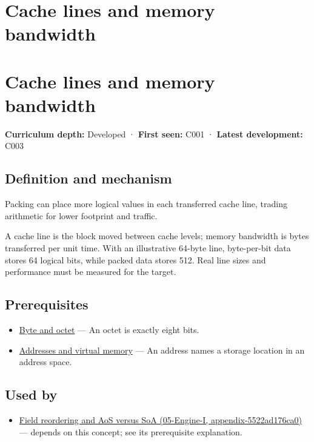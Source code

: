 \hypertarget{appendix-e4ccdbab8320}{}
\section*{Cache lines and memory bandwidth}
\section{Cache lines and memory bandwidth}\label{cache-lines-and-memory-bandwidth}

\textbf{Curriculum depth:} Developed · \textbf{First seen:} C001 · \textbf{Latest development:} C003

\subsection{Definition and mechanism}\label{definition-and-mechanism}

Packing can place more logical values in each transferred cache line, trading arithmetic for lower footprint and traffic.

A cache line is the block moved between cache levels; memory bandwidth is bytes transferred per unit time. With an illustrative 64-byte line, byte-per-bit data stores 64 logical bits, while packed data stores 512. Real line sizes and performance must be measured for the target.

\subsection{Prerequisites}\label{prerequisites}

\begin{itemize}
\tightlist
\item
  \hyperref[appendix-5bee2df85484]{Byte and octet} --- An octet is exactly eight bits.
\item
  \hyperref[appendix-18ee4f913c3c]{Addresses and virtual memory} --- An address names a storage location in an address space.
\end{itemize}

\subsection{Used by}\label{used-by}

\begin{itemize}
\tightlist
\item
  \href{}{Field reordering and AoS versus SoA (05-Engine-I, appendix-5522ad176ca0)} --- depends on this concept; see its prerequisite explanation.
\end{itemize}

